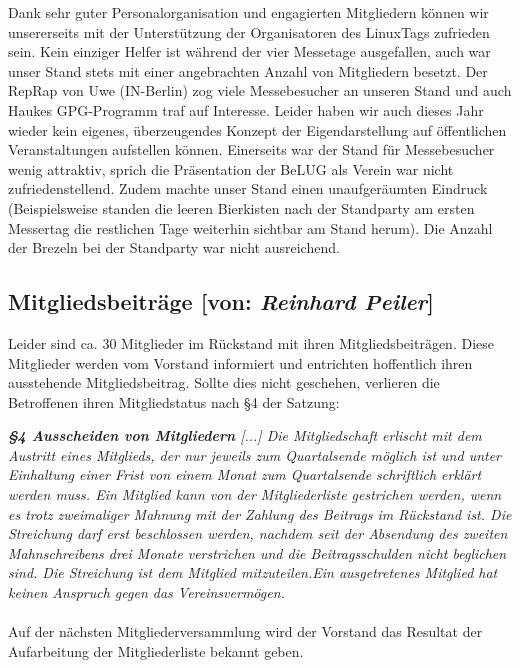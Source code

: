 \documentclass[11pt,a4paper,ngerman]{article}
\begin{document}
Dank sehr guter Personalorganisation und engagierten Mitgliedern können wir 
unsererseits mit der Unterstützung der Organisatoren des LinuxTags zufrieden 
sein. Kein einziger Helfer ist während der vier Messetage ausgefallen, auch war 
unser Stand stets mit einer angebrachten Anzahl von Mitgliedern besetzt. Der 
RepRap von Uwe (IN-Berlin) zog viele Messebesucher an unseren Stand und auch 
Haukes GPG-Programm traf auf Interesse. Leider haben wir auch dieses Jahr 
wieder kein eigenes, überzeugendes Konzept der Eigendarstellung auf 
öffentlichen Veranstaltungen aufstellen können. Einerseits war der Stand für 
Messebesucher wenig attraktiv, sprich die Präsentation der BeLUG als Verein war 
nicht zufriedenstellend. Zudem machte unser Stand einen unaufgeräumten Eindruck 
(Beispielsweise standen die leeren Bierkisten nach der Standparty am ersten 
Messertag die restlichen Tage weiterhin sichtbar am Stand herum). Die Anzahl 
der Brezeln bei der Standparty war nicht ausreichend.
  
  
  
  \subsection{Mitgliedsbeiträge [von: \textcolor{hellgrau.60}{\textsl{Reinhard 
              Peiler}}]}

Leider sind ca. 30 Mitglieder im Rückstand mit ihren Mitgliedsbeiträgen. Diese 
Mitglieder werden vom Vorstand informiert und entrichten hoffentlich ihren 
ausstehende Mitgliedsbeitrag. Sollte dies nicht geschehen, verlieren die 
Betroffenen ihren Mitgliedstatus nach §4 der Satzung:\par

\vspace{1cm}

\textcolor{dunkelgrau.80}{\textit{\textbf{\S4 Ausscheiden von Mitgliedern}
[...] Die Mitgliedschaft erlischt mit dem Austritt eines Mitglieds, der nur 
jeweils zum Quartalsende möglich ist und unter Einhaltung einer Frist von einem 
Monat zum Quartalsende schriftlich erklärt werden muss. Ein Mitglied kann von 
der Mitgliederliste gestrichen werden, wenn es trotz zweimaliger Mahnung mit 
der Zahlung des Beitrags im Rückstand ist. Die Streichung darf erst beschlossen 
werden, nachdem seit der Absendung des zweiten Mahnschreibens drei Monate 
verstrichen und die Beitragsschulden nicht beglichen sind. Die Streichung ist 
dem Mitglied mitzuteilen.Ein ausgetretenes Mitglied hat keinen Anspruch gegen 
das Vereinsvermögen.}}\\
\\
\noindent
Auf der nächsten Mitgliederversammlung wird der Vorstand das Resultat der 
Aufarbeitung der Mitgliederliste bekannt geben.
\end{document}
